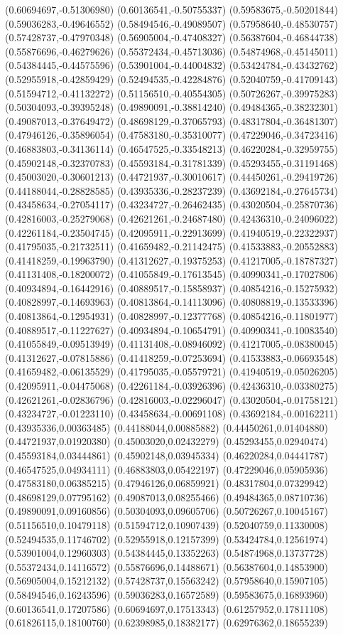 (0.60694697,-0.51306980) (0.60136541,-0.50755337) (0.59583675,-0.50201844) (0.59036283,-0.49646552) (0.58494546,-0.49089507) (0.57958640,-0.48530757) (0.57428737,-0.47970348) (0.56905004,-0.47408327) (0.56387604,-0.46844738) (0.55876696,-0.46279626) (0.55372434,-0.45713036) (0.54874968,-0.45145011) (0.54384445,-0.44575596) (0.53901004,-0.44004832) (0.53424784,-0.43432762) (0.52955918,-0.42859429) (0.52494535,-0.42284876) (0.52040759,-0.41709143) (0.51594712,-0.41132272) (0.51156510,-0.40554305) (0.50726267,-0.39975283) (0.50304093,-0.39395248) (0.49890091,-0.38814240) (0.49484365,-0.38232301) (0.49087013,-0.37649472) (0.48698129,-0.37065793) (0.48317804,-0.36481307) (0.47946126,-0.35896054) (0.47583180,-0.35310077) (0.47229046,-0.34723416) (0.46883803,-0.34136114) (0.46547525,-0.33548213) (0.46220284,-0.32959755) (0.45902148,-0.32370783) (0.45593184,-0.31781339) (0.45293455,-0.31191468) (0.45003020,-0.30601213) (0.44721937,-0.30010617) (0.44450261,-0.29419726) (0.44188044,-0.28828585) (0.43935336,-0.28237239) (0.43692184,-0.27645734) (0.43458634,-0.27054117) (0.43234727,-0.26462435) (0.43020504,-0.25870736) (0.42816003,-0.25279068) (0.42621261,-0.24687480) (0.42436310,-0.24096022) (0.42261184,-0.23504745) (0.42095911,-0.22913699) (0.41940519,-0.22322937) (0.41795035,-0.21732511) (0.41659482,-0.21142475) (0.41533883,-0.20552883) (0.41418259,-0.19963790) (0.41312627,-0.19375253) (0.41217005,-0.18787327) (0.41131408,-0.18200072) (0.41055849,-0.17613545) (0.40990341,-0.17027806) (0.40934894,-0.16442916) (0.40889517,-0.15858937) (0.40854216,-0.15275932) (0.40828997,-0.14693963) (0.40813864,-0.14113096) (0.40808819,-0.13533396) (0.40813864,-0.12954931) (0.40828997,-0.12377768) (0.40854216,-0.11801977) (0.40889517,-0.11227627) (0.40934894,-0.10654791) (0.40990341,-0.10083540) (0.41055849,-0.09513949) (0.41131408,-0.08946092) (0.41217005,-0.08380045) (0.41312627,-0.07815886) (0.41418259,-0.07253694) (0.41533883,-0.06693548) (0.41659482,-0.06135529) (0.41795035,-0.05579721) (0.41940519,-0.05026205) (0.42095911,-0.04475068) (0.42261184,-0.03926396) (0.42436310,-0.03380275) (0.42621261,-0.02836796) (0.42816003,-0.02296047) (0.43020504,-0.01758121) (0.43234727,-0.01223110) (0.43458634,-0.00691108) (0.43692184,-0.00162211) (0.43935336,0.00363485) (0.44188044,0.00885882) (0.44450261,0.01404880) (0.44721937,0.01920380) (0.45003020,0.02432279) (0.45293455,0.02940474) (0.45593184,0.03444861) (0.45902148,0.03945334) (0.46220284,0.04441787) (0.46547525,0.04934111) (0.46883803,0.05422197) (0.47229046,0.05905936) (0.47583180,0.06385215) (0.47946126,0.06859921) (0.48317804,0.07329942) (0.48698129,0.07795162) (0.49087013,0.08255466) (0.49484365,0.08710736) (0.49890091,0.09160856) (0.50304093,0.09605706) (0.50726267,0.10045167) (0.51156510,0.10479118) (0.51594712,0.10907439) (0.52040759,0.11330008) (0.52494535,0.11746702) (0.52955918,0.12157399) (0.53424784,0.12561974) (0.53901004,0.12960303) (0.54384445,0.13352263) (0.54874968,0.13737728) (0.55372434,0.14116572) (0.55876696,0.14488671) (0.56387604,0.14853900) (0.56905004,0.15212132) (0.57428737,0.15563242) (0.57958640,0.15907105) (0.58494546,0.16243596) (0.59036283,0.16572589) (0.59583675,0.16893960) (0.60136541,0.17207586) (0.60694697,0.17513343) (0.61257952,0.17811108) (0.61826115,0.18100760) (0.62398985,0.18382177) (0.62976362,0.18655239) 